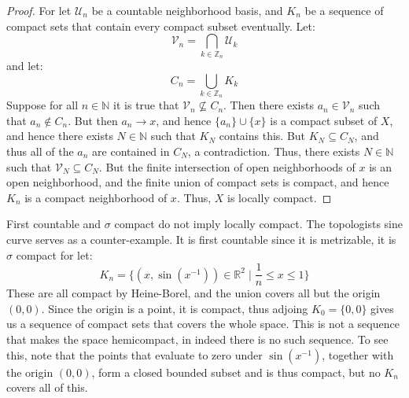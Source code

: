 \documentclass{article}                                                        %
\begin{document}
        \begin{proof}
            For let $\mathcal{U}_{n}$ be a countable neighborhood basis, and
            $K_{n}$ be a sequence of compact sets that contain every compact
            subset eventually. Let:
            \begin{equation}
                \mathcal{V}_{n}=\bigcap_{k\in\mathbb{Z}_{n}}\mathcal{U}_{k}
            \end{equation}
            and let:
            \begin{equation}
                C_{n}=\bigcup_{k\in\mathbb{Z}_{n}}K_{k}
            \end{equation}
            Suppose for all $n\in\mathbb{N}$ it is true that
            $\mathcal{V}_{n}\nsubseteq{C}_{n}$. Then there exists
            $a_{n}\in\mathcal{V}_{n}$ such that $a_{n}\notin{C}_{n}$. But then
            $a_{n}\rightarrow{x}$, and hence $\{a_{n}\}\cup\{x\}$ is a compact
            subset of $X$, and hence there exists $N\in\mathbb{N}$ such that
            $K_{N}$ contains this. But $K_{N}\subseteq{C}_{N}$, and thus
            all of the $a_{n}$ are contained in $C_{N}$, a contradiction. Thus,
            there exists $N\in\mathbb{N}$ such that
            $\mathcal{V}_{N}\subseteq{C}_{N}$. But the finite intersection of
            open neighborhoods of $x$ is an open neighborhood, and the finite
            union of compact sets is compact, and hence $K_{n}$ is a compact
            neighborhood of $x$. Thus, $X$ is locally compact.
        \end{proof}
        \begin{example}
            First countable and $\sigma$ compact do not imply locally compact.
            The topologists sine curve serves as a counter-example. It is
            first countable since it is metrizable, it is $\sigma$ compact for
            let:
            \begin{equation}
                K_{n}=\{(x,\sin(x^{\minus{1}}))\in\mathbb{R}^{2}\;|\;
                    \frac{1}{n}\leq{x}\leq{1}\}
            \end{equation}
            These are all compact by Heine-Borel, and the union covers all but
            the origin $(0,0)$. Since the origin is a point, it is compact,
            thus adjoing $K_{0}=\{0,0\}$ gives us a sequence of compact sets
            that covers the whole space. This is not a sequence that makes
            the space hemicompact, in indeed there is no such sequence. To see
            this, note that the points that evaluate to zero under
            $\sin(x^{\minus{1}})$, together with the origin $(0,0)$, form a
            closed bounded subset and is thus compact, but no $K_{n}$ covers all
            of this.
        \end{example}
\end{document}
